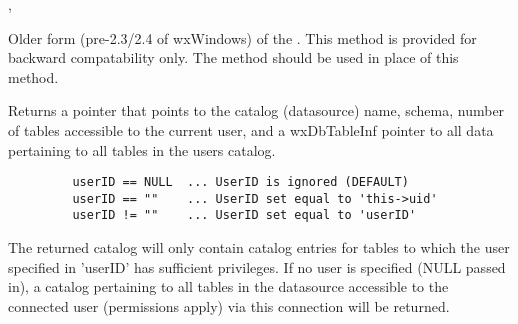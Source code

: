 
, 

\label{wxdbfwdonlycursors}


Older form (pre-2.3/2.4 of wxWindows) of the
.  This method is
provided for backward compatability only.  The method
 should be
used in place of this method.



\label{wxdbgetcatalog}


Returns a  pointer that points to the catalog
(datasource) name, schema, number of tables accessible to the current user,
and a wxDbTableInf pointer to all data pertaining to all tables in the users
catalog.



\begin{verbatim}
         userID == NULL  ... UserID is ignored (DEFAULT)
         userID == ""    ... UserID set equal to 'this->uid'
         userID != ""    ... UserID set equal to 'userID'
\end{verbatim}


The returned catalog will only contain catalog entries for tables to which the user specified in 'userID' has sufficient privileges.  If no user is specified (NULL passed in), a catalog pertaining to all tables in the datasource accessible to the connected user (permissions apply) via this connection will be returned.

\label{wxdbgetcolumncount}



